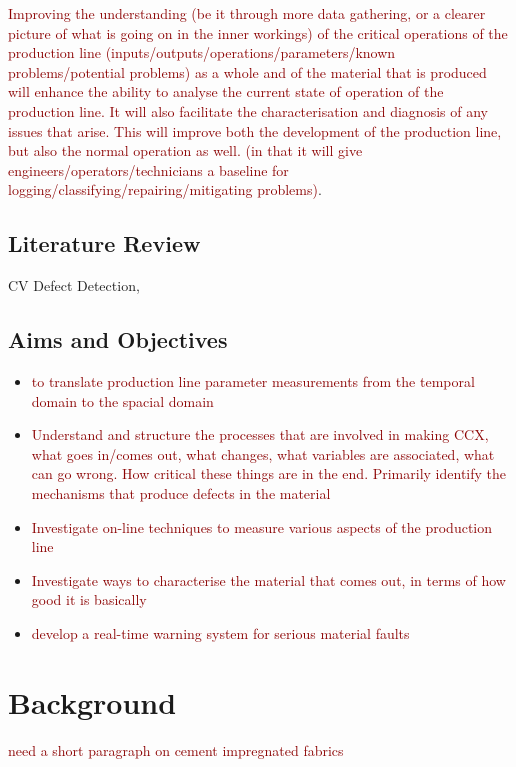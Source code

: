 \documentclass[12pt]{report}
\newcommand{\tcr}[1]{\textcolor{darkRed}{#1}}
\begin{document}
        \tcr{Improving the understanding (be it through more data gathering, or a clearer picture of what is going on in the inner workings) of the critical operations of the production line (inputs/outputs/operations/parameters/known problems/potential problems) as a whole and of the material that is produced will enhance the ability to analyse the current state of operation of the production line. It will also facilitate the characterisation and diagnosis of any issues that arise. This will improve both the development of the production line, but also the normal operation as well. (in that it will give engineers/operators/technicians a baseline for logging/classifying/repairing/mitigating problems)}.

    \section{Literature Review}
    CV Defect Detection,
    \section{Aims and Objectives}
    
    \begin{itemize}
        \item \tcr{to translate production line parameter measurements from the temporal domain to the spacial domain}
        \item \tcr{Understand and structure the processes that are involved in making CCX, what goes in/comes out, what changes, what variables are associated, what can go wrong. How critical these things are in the end. Primarily identify the mechanisms that produce defects in the material}
        \item \tcr{Investigate on-line techniques to measure various aspects of the production line}
        \item \tcr{Investigate ways to characterise the material that comes out, in terms of how good it is basically}
        \item \tcr{develop a real-time warning system for serious material faults}
    \end{itemize}
        
\pagebreak
\chapter{Background}

    \tcr{need a short paragraph on cement impregnated fabrics}
    
\end{document}
